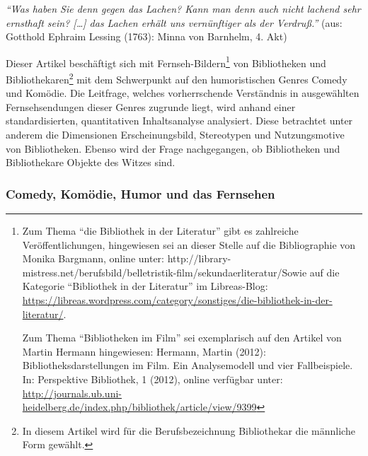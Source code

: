 \begin{small}
\emph{\enquote{Was haben Sie denn gegen das Lachen? Kann man denn auch
nicht lachend sehr ernsthaft sein? {[}\ldots{}{]} das Lachen erhält uns
vernünftiger als der Verdruß.}} (aus: Gotthold Ephraim Lessing (1763):
Minna von Barnhelm, 4. Akt)
\end{small}

\noindent Dieser Artikel beschäftigt sich mit Fernseh-Bildern\footnote{Zum Thema
  \enquote{die Bibliothek in der Literatur} gibt es zahlreiche
  Veröffentlichungen, hingewiesen sei an dieser Stelle auf die
  Bibliographie von Monika Bargmann, online unter:
  http://library-mistress.net/berufsbild/belletristik-film/sekundaerliteratur/Sowie
  auf die Kategorie \enquote{Bibliothek in der Literatur} im
  Libreas-Blog:
  \url{https://libreas.wordpress.com/category/sonstiges/die-bibliothek-in-der-literatur/}.

  Zum Thema \enquote{Bibliotheken im Film} sei exemplarisch auf den
  Artikel von Martin Hermann hingewiesen: Hermann, Martin (2012):
  Bibliotheksdarstellungen im Film. Ein Analysemodell und vier
  Fallbeispiele. In: Perspektive Bibliothek, 1 (2012), online verfügbar
  unter:
  \url{http://journals.ub.uni-heidelberg.de/index.php/bibliothek/article/view/9399}}
von Bibliotheken und Bibliothekaren\footnote{In diesem Artikel wird für
  die Berufsbezeichnung Bibliothekar die männliche Form gewählt.} mit
dem Schwerpunkt auf den humoristischen Genres Comedy und Komödie. Die
Leitfrage, welches vorherrschende Verständnis in ausgewählten
Fernsehsendungen dieser Genres zugrunde liegt, wird anhand einer
standardisierten, quantitativen Inhaltsanalyse analysiert. Diese
betrachtet unter anderem die Dimensionen Erscheinungsbild, Stereotypen
und Nutzungsmotive von Bibliotheken. Ebenso wird der Frage nachgegangen,
ob Bibliotheken und Bibliothekare Objekte des Witzes sind.

\subsubsection{Comedy, Komödie, Humor und das
Fernsehen}\label{comedy-komuxf6die-humor-und-das-fernsehen}

